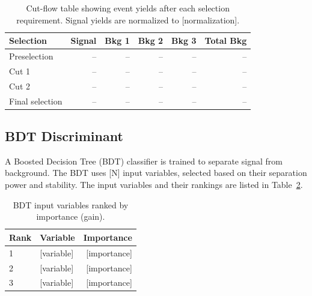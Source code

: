 \begin{table}[htbp]
  \centering
  \caption{Cut-flow table showing event yields after each selection requirement.
           Signal yields are normalized to [normalization].}
  \label{tab:cutflow}
  \begin{tabular}{lrrrrr}
    \toprule
    Selection & Signal & Bkg 1 & Bkg 2 & Bkg 3 & Total Bkg \\
    \midrule
    Preselection       & -- & -- & -- & -- & -- \\
    Cut 1              & -- & -- & -- & -- & -- \\
    Cut 2              & -- & -- & -- & -- & -- \\
    Final selection    & -- & -- & -- & -- & -- \\
    \bottomrule
  \end{tabular}
\end{table}

\subsection{BDT Discriminant}
\label{sec:selection:bdt}


A Boosted Decision Tree (BDT) classifier is trained to separate signal from
background. The BDT uses [N] input variables, selected based on their
separation power and stability. The input variables and their rankings are
listed in Table~\ref{tab:bdt_variables}.


\begin{table}[htbp]
  \centering
  \caption{BDT input variables ranked by importance (gain).}
  \label{tab:bdt_variables}
  \begin{tabular}{llr}
    \toprule
    Rank & Variable & Importance \\
    \midrule
    1 & [variable] & [importance] \\
    2 & [variable] & [importance] \\
    3 & [variable] & [importance] \\
    \bottomrule
  \end{tabular}
\end{table}


